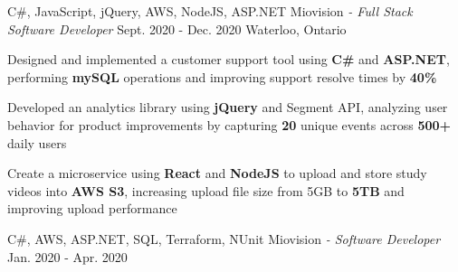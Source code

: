 \begin{siderules}
  \begin{cventries}
    \cventry
    {C\#, JavaScript, jQuery, AWS, NodeJS, ASP.NET}
    {Miovision\hspace{0.15em} \bodyfontlight\itshape{- Full Stack Software Developer}}
    {Sept. 2020 - Dec. 2020}
    {Waterloo, Ontario}
    {
      \begin{cvitems}
        \item{Designed and implemented a customer support tool using \textbf{C\#} and \textbf{ASP.NET}, performing \textbf{mySQL} operations and improving support resolve times by \textbf{40\%} }
        \item{Developed an analytics library using \textbf{jQuery} and Segment API, analyzing user behavior for product improvements by capturing \textbf{20} unique events across \textbf{500+} daily users}
        \item {Create a microservice using \textbf{React} and \textbf{NodeJS} to upload and store study videos into \textbf{AWS S3}, increasing upload file size from 5GB to \textbf{5TB} and improving upload performance }
      \end{cvitems}
    }
    \cventry
    {C\#, AWS, ASP.NET, SQL, Terraform, NUnit}
    {Miovision\hspace{0.15em} \bodyfontlight\itshape{- Software Developer}}
    {Jan. 2020 - Apr. 2020}

\end{cventries}
\end{siderules}
